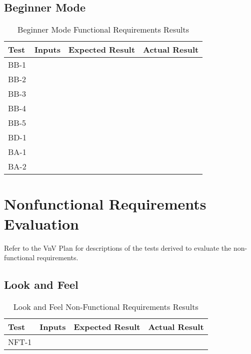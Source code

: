 \documentclass[12pt, titlepage]{article}
\begin{document}
\subsection{Beginner Mode}

\begin{table}[H]
  \centering
    \setlength{\leftmargini}{0cm}
    \begin{tabular}{| >{\centering\arraybackslash}m{1.5cm} | 
      >{\centering\arraybackslash}m{4cm} | 
      >{\centering\arraybackslash}m{4cm} | 
      >{\centering\arraybackslash}m{4cm} |}
    \hline
    \rowcolor[gray]{0.9}
    Test & Inputs & Expected Result & Actual Result\\
    \hline
    BB-1 &  &  & \\
    \hline
    BB-2 &  &  & \\
    \hline
    BB-3 &  &  & \\
    \hline
    BB-4 &  &  & \\
    \hline
    BB-5 &  &  & \\
    \hline
    BD-1 &  &  & \\
    \hline
    BA-1 &  &  & \\
    \hline
    BA-2 &  &  & \\
    \hline
    \end{tabular}
  \caption{Beginner Mode Functional Requirements Results}
\end{table}

\section{Nonfunctional Requirements Evaluation}
Refer to the VnV Plan for descriptions of the tests derived to evaluate the non-functional requirements.

\subsection{Look and Feel}

\begin{table}[H]
  \centering
    \setlength{\leftmargini}{0cm}
    \begin{tabular}{| >{\centering\arraybackslash}m{1.5cm} | 
      >{\centering\arraybackslash}m{4cm} | 
      >{\centering\arraybackslash}m{4cm} | 
      >{\centering\arraybackslash}m{4cm} |}
    \hline
    \rowcolor[gray]{0.9}
    Test & Inputs & Expected Result & Actual Result\\
    \hline
    NFT-1 &  &  & \\
    \hline
    \end{tabular}
  \caption{Look and Feel Non-Functional Requirements Results}
\end{table}
		
\end{document}
